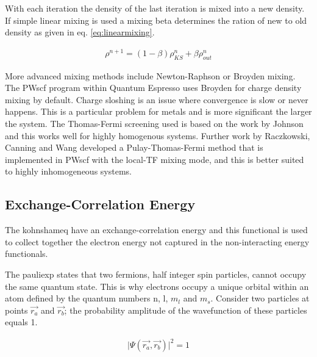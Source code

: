 With each iteration the density of the last iteration is mixed into a new density.  If simple linear mixing is used a mixing beta determines the ration of new to old density as given in eq. \ref{eq:linearmixing}\cite{jfannett1996}.

\begin{equation}
\begin{split}
\rho^{n+1} = (1 - \beta) \rho_{KS}^{n} + \beta \rho_{out}^{n}
\end{split}
\label{eq:linearmixing}
\end{equation}

More advanced mixing methods include Newton-Raphson or Broyden mixing.  The PWscf program within Quantum Espresso uses Broyden for charge density mixing by default.  Charge sloshing is an issue where convergence is slow or never happens.  This is a particular problem for metals\cite{chargesloshing2} and is more significant the larger the system\cite{localtfRaczkowski}.  The Thomas-Fermi screening used is based on the work by Johnson\cite{thomasfermijohnson} and this works well for highly homogenous systems.  Further work by Raczkowski, Canning and Wang\cite{localtfraczkowski} developed a Pulay-Thomas-Fermi method that is implemented in PWscf with the local-TF mixing mode, and this is better suited to highly inhomogeneous systems.

\FloatBarrier
\subsection{Exchange-Correlation Energy}

The \Gls{kohnshameq} have an exchange-correlation energy and this functional is used to collect together the electron energy not captured in the non-interacting energy functionals.

The \Gls{pauliexp} states that two \gls{fermion}s, half integer spin particles, cannot occupy the same quantum state.  This is why electrons occupy a unique orbital within an atom defined by the quantum numbers n, l, $m_l$ and $m_s$.  Consider two particles at points $\vec{r_a}$ and $\vec{r_b}$; the probability amplitude of the wavefunction of these particles equals 1.

\begin{equation}
  \begin{split}
    \lvert \Psi(\vec{r_a}, \vec{r_b}) \rvert ^2 = 1
  \end{split}
  \label{eq:eqEulersFormula}
\end{equation}

